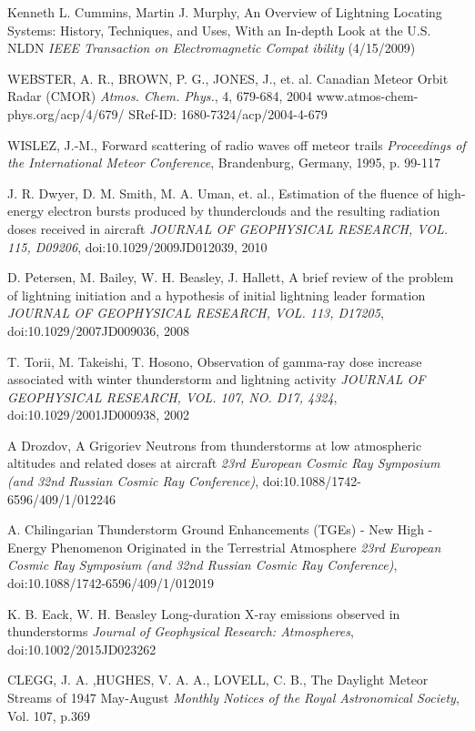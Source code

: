 \documentclass[twoside]{ctuthesis}
\theoremstyle{plain}
\theoremstyle{definition}
\theoremstyle{note}
\begin{document}
\begin{thebibliography}{99}
Kenneth L. Cummins, Martin J. Murphy,
An Overview of Lightning Locating Systems: History, Techniques, and Uses, With an In-depth Look at 
the U.S. NLDN \emph{IEEE Transaction on Electromagnetic Compat
ibility} (4/15/2009)


WEBSTER, A. R., BROWN, P. G., JONES, J., et. al.
Canadian Meteor Orbit Radar (CMOR)
\emph{Atmos. Chem. Phys.}, 4, 679-684, 2004
www.atmos-chem-phys.org/acp/4/679/
SRef-ID: 1680-7324/acp/2004-4-679

WISLEZ, J.-M.,
Forward scattering of radio waves off meteor trails
\emph{Proceedings of the International Meteor Conference}, Brandenburg, Germany, 1995, p. 99-117

J. R. Dwyer, D. M. Smith, M. A. Uman, et. al.,
Estimation of the fluence of high-energy electron bursts produced by thunderclouds and the resulting radiation doses received in aircraft
\emph{JOURNAL OF GEOPHYSICAL RESEARCH, VOL. 115, D09206}, doi:10.1029/2009JD012039, 2010

D. Petersen, M. Bailey, W. H. Beasley, J. Hallett,
A brief review of the problem of lightning initiation and a hypothesis of initial lightning leader formation
\emph{JOURNAL OF GEOPHYSICAL RESEARCH, VOL. 113, D17205}, doi:10.1029/2007JD009036, 2008

T. Torii, M. Takeishi, T. Hosono,
Observation of gamma-ray dose increase associated with winter thunderstorm and lightning activity
\emph{JOURNAL OF GEOPHYSICAL RESEARCH, VOL. 107, NO. D17, 4324}, doi:10.1029/2001JD000938, 2002

A Drozdov, A Grigoriev
Neutrons from thunderstorms at low atmospheric altitudes and related doses at aircraft
\emph{23rd European Cosmic Ray Symposium (and 32nd Russian Cosmic Ray Conference)}, doi:10.1088/1742-6596/409/1/012246

A. Chilingarian
Thunderstorm Ground Enhancements (TGEs) - New High - Energy Phenomenon Originated in the Terrestrial Atmosphere
\emph{23rd European Cosmic Ray Symposium (and 32nd Russian Cosmic Ray Conference)}, doi:10.1088/1742-6596/409/1/012019

K. B. Eack, W. H. Beasley
Long-duration X-ray emissions observed in thunderstorms
\emph{Journal of Geophysical Research: Atmospheres}, doi:10.1002/2015JD023262

CLEGG, J. A. ,HUGHES,  V. A. A., LOVELL, C. B., 
The Daylight Meteor Streams of 1947 May-August
\emph{Monthly Notices of the Royal Astronomical Society}, Vol. 107, p.369


\end{thebibliography}
\end{document}
